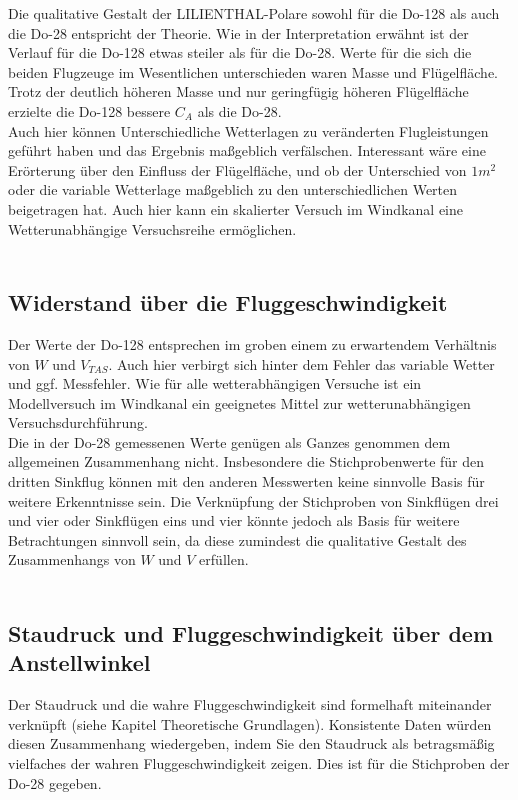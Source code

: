 Die qualitative Gestalt der LILIENTHAL-Polare sowohl für die Do-128 als auch die Do-28 entspricht der Theorie. Wie in der Interpretation erwähnt ist der Verlauf für die Do-128 etwas steiler als für die Do-28. Werte für die sich die beiden Flugzeuge im Wesentlichen unterschieden waren Masse und Flügelfläche. Trotz der deutlich höheren Masse und nur geringfügig höheren Flügelfläche erzielte die Do-128 bessere $C_{A}$ als die Do-28.\\
Auch hier können Unterschiedliche Wetterlagen zu veränderten Flugleistungen geführt haben und das Ergebnis maßgeblich verfälschen.
Interessant wäre eine Erörterung über den Einfluss der Flügelfläche, und ob der Unterschied von $1m^{2}$ oder die variable Wetterlage maßgeblich zu den unterschiedlichen Werten beigetragen hat. Auch hier kann ein skalierter Versuch im Windkanal eine Wetterunabhängige Versuchsreihe ermöglichen.\\\\

\subsection{Widerstand über die Fluggeschwindigkeit}

Der Werte der Do-128 entsprechen im groben einem zu erwartendem Verhältnis von $W$ und $V_{TAS}$. Auch hier verbirgt sich hinter dem Fehler das variable Wetter und ggf. Messfehler. Wie für alle wetterabhängigen Versuche ist ein Modellversuch im Windkanal ein geeignetes Mittel zur wetterunabhängigen Versuchsdurchführung.\\
Die in der Do-28 gemessenen Werte genügen als Ganzes genommen dem allgemeinen Zusammenhang nicht. Insbesondere die Stichprobenwerte für den dritten Sinkflug können mit den anderen Messwerten keine sinnvolle Basis für weitere Erkenntnisse sein.
Die Verknüpfung der Stichproben von Sinkflügen drei und vier oder Sinkflügen eins und vier könnte jedoch als Basis für weitere Betrachtungen sinnvoll sein, da diese zumindest die qualitative Gestalt des Zusammenhangs von $W$ und $V$ erfüllen.\\\\

\subsection{Staudruck und Fluggeschwindigkeit über dem Anstellwinkel}
Der Staudruck und die wahre Fluggeschwindigkeit sind formelhaft miteinander verknüpft (siehe Kapitel Theoretische Grundlagen). Konsistente Daten würden diesen Zusammenhang wiedergeben, indem Sie den Staudruck als betragsmäßig vielfaches der wahren Fluggeschwindigkeit zeigen. Dies ist für die Stichproben der Do-28 gegeben.
\vspace{10mm}

